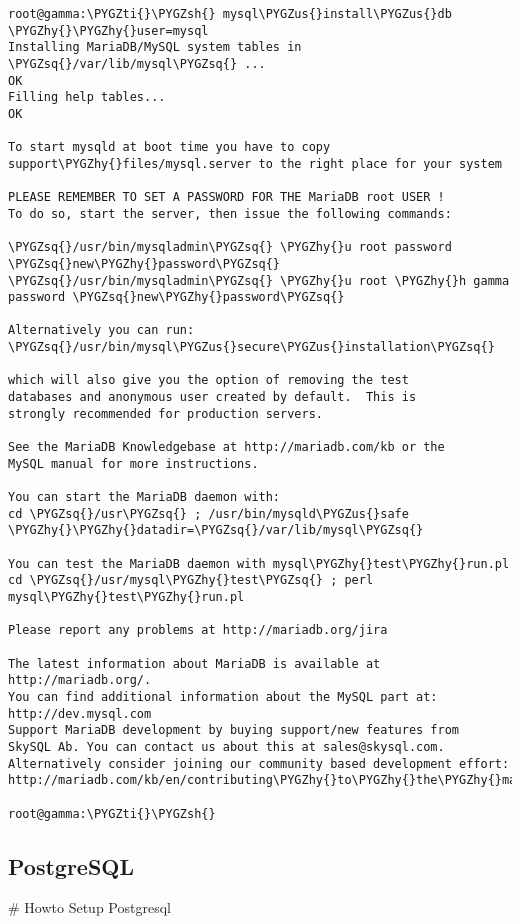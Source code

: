 \documentclass[letterpaper,10pt,english]{sphinxmanual}
\def\PYGZus{\char`\_}
\def\PYGZsh{\char`\#}
\def\PYGZhy{\char`\-}
\def\PYGZsq{\char`\'}
\def\PYGZti{\char`\~}
\begin{document}
\begin{Verbatim}[commandchars=\\\{\}]
root@gamma:\PYGZti{}\PYGZsh{} mysql\PYGZus{}install\PYGZus{}db \PYGZhy{}\PYGZhy{}user=mysql
Installing MariaDB/MySQL system tables in \PYGZsq{}/var/lib/mysql\PYGZsq{} ...
OK
Filling help tables...
OK

To start mysqld at boot time you have to copy
support\PYGZhy{}files/mysql.server to the right place for your system

PLEASE REMEMBER TO SET A PASSWORD FOR THE MariaDB root USER !
To do so, start the server, then issue the following commands:

\PYGZsq{}/usr/bin/mysqladmin\PYGZsq{} \PYGZhy{}u root password \PYGZsq{}new\PYGZhy{}password\PYGZsq{}
\PYGZsq{}/usr/bin/mysqladmin\PYGZsq{} \PYGZhy{}u root \PYGZhy{}h gamma password \PYGZsq{}new\PYGZhy{}password\PYGZsq{}

Alternatively you can run:
\PYGZsq{}/usr/bin/mysql\PYGZus{}secure\PYGZus{}installation\PYGZsq{}

which will also give you the option of removing the test
databases and anonymous user created by default.  This is
strongly recommended for production servers.

See the MariaDB Knowledgebase at http://mariadb.com/kb or the
MySQL manual for more instructions.

You can start the MariaDB daemon with:
cd \PYGZsq{}/usr\PYGZsq{} ; /usr/bin/mysqld\PYGZus{}safe \PYGZhy{}\PYGZhy{}datadir=\PYGZsq{}/var/lib/mysql\PYGZsq{}

You can test the MariaDB daemon with mysql\PYGZhy{}test\PYGZhy{}run.pl
cd \PYGZsq{}/usr/mysql\PYGZhy{}test\PYGZsq{} ; perl mysql\PYGZhy{}test\PYGZhy{}run.pl

Please report any problems at http://mariadb.org/jira

The latest information about MariaDB is available at http://mariadb.org/.
You can find additional information about the MySQL part at:
http://dev.mysql.com
Support MariaDB development by buying support/new features from
SkySQL Ab. You can contact us about this at sales@skysql.com.
Alternatively consider joining our community based development effort:
http://mariadb.com/kb/en/contributing\PYGZhy{}to\PYGZhy{}the\PYGZhy{}mariadb\PYGZhy{}project/

root@gamma:\PYGZti{}\PYGZsh{}
\end{Verbatim}


\subsection{PostgreSQL}
\label{sdocs/databases/postgresql/postgresql:postgresql}\label{sdocs/databases/postgresql/postgresql::doc}
\# Howto Setup Postgresql
\end{document}

